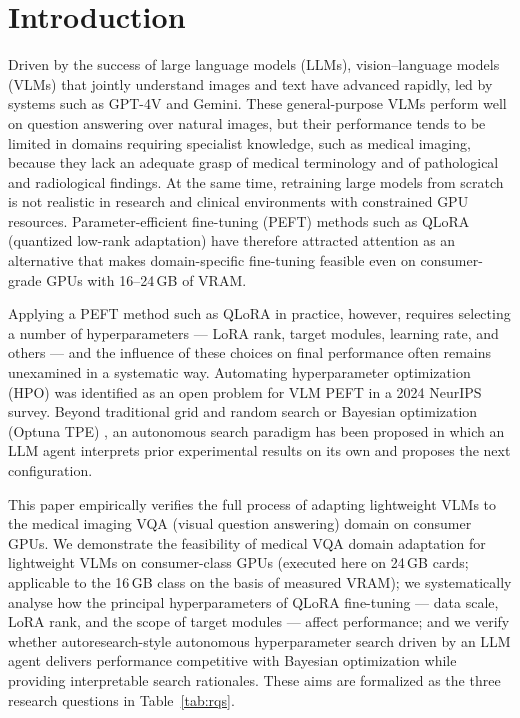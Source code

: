 \section{Introduction}
\label{sec:intro}

Driven by the success of large language models (LLMs), vision--language models
(VLMs) that jointly understand images and text have advanced rapidly, led by
systems such as GPT-4V and Gemini. These general-purpose VLMs perform well on
question answering over natural images, but their performance tends to be limited
in domains requiring specialist knowledge, such as medical imaging, because they
lack an adequate grasp of medical terminology and of pathological and
radiological findings. At the same time, retraining large models from scratch is
not realistic in research and clinical environments with constrained GPU
resources. Parameter-efficient fine-tuning (PEFT) methods such as QLoRA
(quantized low-rank adaptation) \citep{dettmers2023qlora} have therefore
attracted attention as an alternative that makes domain-specific fine-tuning
feasible even on consumer-grade GPUs with 16--24\,GB of VRAM.

Applying a PEFT method such as QLoRA in practice, however, requires selecting a
number of hyperparameters --- LoRA rank, target modules, learning rate, and
others --- and the influence of these choices on final performance often remains
unexamined in a systematic way. Automating hyperparameter optimization (HPO) was
identified as an open problem for VLM PEFT in a 2024 NeurIPS survey. Beyond
traditional grid and random search \citep{bergstra2012random} or Bayesian
optimization (Optuna TPE) \citep{akiba2019optuna}, an autonomous search paradigm
has been proposed in which an LLM agent interprets prior experimental results on
its own and proposes the next configuration.

This paper empirically verifies the full process of adapting lightweight VLMs to
the medical imaging VQA (visual question answering) domain on consumer GPUs. We
demonstrate the feasibility of medical VQA domain adaptation for lightweight VLMs
on consumer-class GPUs (executed here on 24\,GB cards; applicable to the 16\,GB
class on the basis of measured VRAM); we systematically analyse how the principal
hyperparameters of QLoRA fine-tuning --- data scale, LoRA rank, and the scope of
target modules --- affect performance; and we verify whether autoresearch-style
autonomous hyperparameter search driven by an LLM agent delivers performance
competitive with Bayesian optimization while providing interpretable search
rationales. These aims are formalized as the three research questions in
Table~\ref{tab:rqs}.

